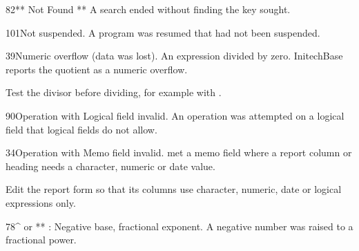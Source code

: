 \begin{XbaseMessageEntry}{82}{** Not Found **}
A search ended without finding the key sought.
\end{XbaseMessageEntry}

\begin{XbaseMessageEntry}{101}{Not suspended.}
A program was resumed that had not been suspended.
\end{XbaseMessageEntry}

\begin{XbaseMessageEntry}{39}{Numeric overflow (data was lost).}
An expression divided by zero. InitechBase reports the quotient as a numeric overflow.

Test the divisor before dividing, for example with .
\end{XbaseMessageEntry}

\begin{XbaseMessageEntry}{90}{Operation with Logical field invalid.}
An operation was attempted on a logical field that logical fields do not allow.
\end{XbaseMessageEntry}

\begin{XbaseMessageEntry}{34}{Operation with Memo field invalid.}
 met a memo field where a report column or heading needs a character, numeric or date value.

Edit the report form so that its columns use character, numeric, date or logical expressions only.
\end{XbaseMessageEntry}

\begin{XbaseMessageEntry}{78}{^ or ** : Negative base, fractional exponent.}
A negative number was raised to a fractional power.
\end{XbaseMessageEntry}

